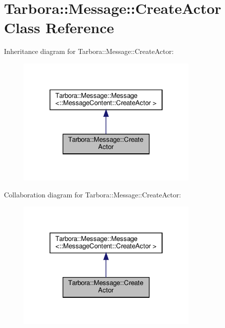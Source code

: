 \hypertarget{classTarbora_1_1Message_1_1CreateActor}{}\section{Tarbora\+:\+:Message\+:\+:Create\+Actor Class Reference}
\label{classTarbora_1_1Message_1_1CreateActor}


Inheritance diagram for Tarbora\+:\+:Message\+:\+:Create\+Actor\+:
\nopagebreak
\begin{figure}[H]
\begin{center}
\leavevmode
\includegraphics[width=250pt]{classTarbora_1_1Message_1_1CreateActor__inherit__graph}
\end{center}
\end{figure}


Collaboration diagram for Tarbora\+:\+:Message\+:\+:Create\+Actor\+:
\nopagebreak
\begin{figure}[H]
\begin{center}
\leavevmode
\includegraphics[width=250pt]{classTarbora_1_1Message_1_1CreateActor__coll__graph}
\end{center}
\end{figure}
